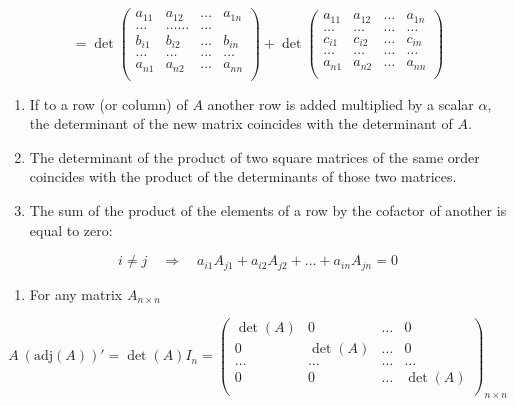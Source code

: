 \documentclass[11pt]{article}
\providecommand{\tightlist}{%
      \setlength{\itemsep}{0pt}\setlength{\parskip}{0pt}}
\begin{document}
\[
  = \det \begin{pmatrix}  a_{11} & a_{12} & \ldots & a_{1n} \\ \ldots & \ldots  \ldots & \ldots \\ b_{i1} & b_{i2} & \ldots & b_{in} \\ \ldots & \ldots& \ldots & \ldots \\ a_{n1} & a_{n2} & \ldots & a_{nn} \\ \end{pmatrix} +  \det \begin{pmatrix}    a_{11} & a_{12} & \ldots & a_{1n} \\ \ldots & \ldots & \ldots & \ldots \\ c_{i1} & c_{i2} & \ldots & c_{in} \\ \ldots & \ldots & \ldots & \ldots \\ a_{n1} & a_{n2} & \ldots & a_{nn} \\ \end{pmatrix}
  \]

\begin{enumerate}
\def\labelenumi{\arabic{enumi}.}
\item
  If to a row (or column) of \(A\) another row is added multiplied by a
  scalar \(\alpha\), the determinant of the new matrix coincides with
  the determinant of \(A\).
\item
  The determinant of the product of two square matrices of the same
  order coincides with the product of the determinants of those two
  matrices.
\item
  The sum of the product of the elements of a row by the cofactor of
  another is equal to zero:
\end{enumerate}

\[
  i \neq j \quad \Rightarrow \quad a_{i1} A_{j1} + a_{i2} A_{j2} + \ldots + a_{in} A_{jn} = 0
  \]

\begin{enumerate}
\def\labelenumi{\arabic{enumi}.}
\tightlist
\item
  For any matrix \(A_{n\times n}\)
\end{enumerate}

\[
  A \: \left(  \text{adj}(A) \right)' = \det(A) I_n = 
  \begin{pmatrix} \det(A) & 0 & \ldots & 0 \\ 0 & \det(A) & \ldots & 0 \\ \ldots & \ldots & \ldots & \ldots \\ 0 & 0 & \ldots & \det(A) \\ \end{pmatrix}_{n \times n}
  \]
\end{document}
